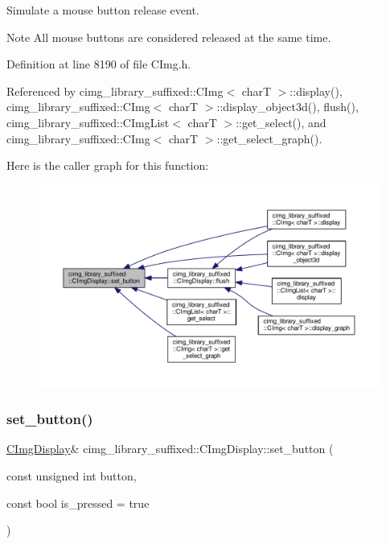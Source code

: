 Simulate a mouse button release event. 

\begin{DoxyNote}{Note}
All mouse buttons are considered released at the same time. 
\end{DoxyNote}


Definition at line 8190 of file C\+Img.\+h.



Referenced by cimg\+\_\+library\+\_\+suffixed\+::\+C\+Img$<$ char\+T $>$\+::display(), cimg\+\_\+library\+\_\+suffixed\+::\+C\+Img$<$ char\+T $>$\+::display\+\_\+object3d(), flush(), cimg\+\_\+library\+\_\+suffixed\+::\+C\+Img\+List$<$ char\+T $>$\+::get\+\_\+select(), and cimg\+\_\+library\+\_\+suffixed\+::\+C\+Img$<$ char\+T $>$\+::get\+\_\+select\+\_\+graph().

Here is the caller graph for this function\+:
\nopagebreak
\begin{figure}[H]
\begin{center}
\leavevmode
\includegraphics[width=350pt]{d5/d53/structcimg__library__suffixed_1_1CImgDisplay_a9626cbb82f0db7c2f8a9936822e62125_icgraph}
\end{center}
\end{figure}
\mbox{\label{structcimg__library__suffixed_1_1CImgDisplay_a940f41b7e04ec77be7646f87de38b619}} 
\subsubsection{\texorpdfstring{set\+\_\+button()}{set\_button()}\hspace{0.1cm}{\footnotesize\ttfamily [2/2]}}
{\footnotesize\ttfamily \hyperlink{structcimg__library__suffixed_1_1CImgDisplay}{C\+Img\+Display}\& cimg\+\_\+library\+\_\+suffixed\+::\+C\+Img\+Display\+::set\+\_\+button (\begin{DoxyParamCaption}\item[{const unsigned int}]{button,  }\item[{const bool}]{is\+\_\+pressed = {\ttfamily true} }\end{DoxyParamCaption})\hspace{0.3cm}{\ttfamily [inline]}}



